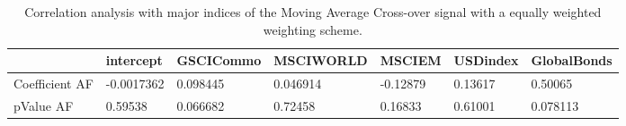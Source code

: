 \begin{table}[H]
\centering
\begin{tabular}{lllllll}
& intercept & GSCICommo & MSCIWORLD & MSCIEM & USDindex & GlobalBonds \\ 
\hline 
Coefficient AF & -0.0017362 & 0.098445 & 0.046914 & -0.12879 & 0.13617 & 0.50065 \\ 
pValue AF & 0.59538 & 0.066682 & 0.72458 & 0.16833 & 0.61001 & 0.078113 \\ 
\hline
\end{tabular}
\caption{Correlation analysis with major indices of the Moving Average Cross-over signal with a equally weighted weighting scheme.}
\label{MAEW_AFACTOR}
\end{table}